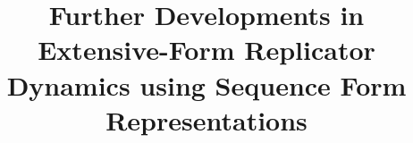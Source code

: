 \documentclass{aamas2013}
\begin{document}

\title{Further Developments in Extensive-Form Replicator Dynamics using Sequence Form Representations}




%
%
%
%

%

\end{document}
